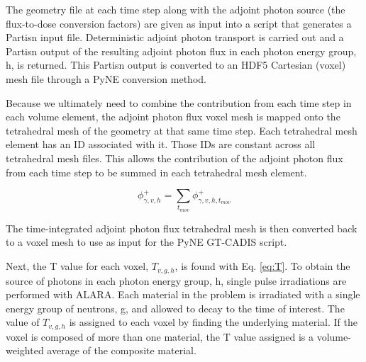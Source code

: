 The geometry file at each time step along with the adjoint photon source (the
flux-to-dose conversion factors) are given as input into a script that
generates a Partisn input file.  Deterministic adjoint photon transport is
carried out and a Partisn output of the resulting adjoint photon flux in each
photon energy group, h, is
returned.  This Partisn output is converted to an HDF5 Cartesian (voxel) mesh file
through a PyNE conversion method.  

Because we ultimately need to combine the contribution from each time step in each
volume element, the adjoint photon flux voxel mesh is mapped onto the
tetrahedral mesh of the geometry at that same time step.  Each tetrahedral
mesh element has an ID associated with it.  Those IDs are constant across all
tetrahedral mesh files.  This allows the contribution of the adjoint photon 
flux from each time step to be summed in each tetrahedral mesh element.


\begin{equation}\label{eq:sum}
	\phi_{\gamma,v, h}^{+} = \sum_{t_{mov}}{\phi_{\gamma,v,h,t_{mov}}^{+}}
\end{equation}

The time-integrated 
adjoint photon flux tetrahedral mesh is then converted back to a voxel mesh
to use as input for the PyNE GT-CADIS script. 

Next, the T value for each voxel, $T_{v,g,h}$, is found with Eq.
\ref{eq:T}.
To obtain the source of photons in each photon energy group, h, 
single pulse irradiations are performed with ALARA.
Each material in the problem is irradiated with a single energy group of
neutrons, g, and allowed to decay to the time of interest.  The value
of $T_{v,g,h}$ is assigned to each voxel by finding the underlying material.
If the voxel is composed of more than one material, the T value assigned is
a volume-weighted average of the composite material.

